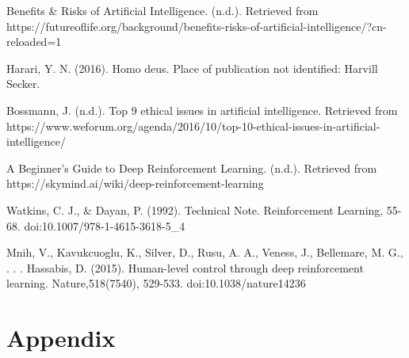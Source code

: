 \documentclass[
a4paper,
11pt,
english
]{report}
\begin{document}
\noindent [9] Benefits & Risks of Artificial Intelligence. (n.d.). Retrieved from https://futureoflife.org/background/benefits-risks-of-artificial-intelligence/?cn-reloaded=1

\noindent [10] Harari, Y. N. (2016). Homo deus. Place of publication not identified: Harvill Secker.

\noindent [11] Bossmann, J. (n.d.). Top 9 ethical issues in artificial intelligence. Retrieved from https://www.weforum.org/agenda/2016/10/top-10-ethical-issues-in-artificial-intelligence/

\noindent [12] A Beginner's Guide to Deep Reinforcement Learning. (n.d.). Retrieved from https://skymind.ai/wiki/deep-reinforcement-learning

\noindent [13] Watkins, C. J., & Dayan, P. (1992). Technical Note. Reinforcement Learning, 55-68. doi:10.1007/978-1-4615-3618-5_4

\noindent [14] Mnih, V., Kavukcuoglu, K., Silver, D., Rusu, A. A., Veness, J., Bellemare, M. G., . . . Hassabis, D. (2015). Human-level control through deep reinforcement learning. Nature,518(7540), 529-533. doi:10.1038/nature14236

\chapter*{Appendix}
\end{document}
